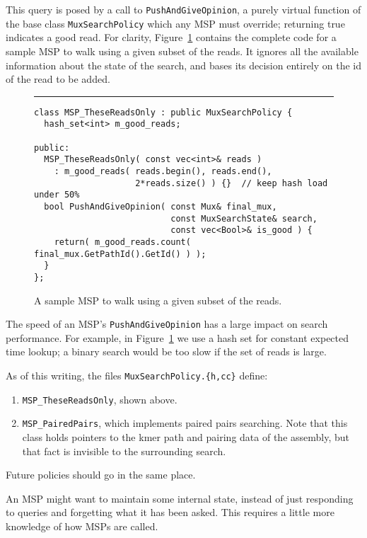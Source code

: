 \documentclass[11pt]{article}
\begin{document}
This query is posed by a call to {\tt PushAndGiveOpinion}, a purely virtual function
of the base class {\tt MuxSearchPolicy} which any MSP must override; returning
true indicates a good read.
For clarity, Figure~\ref{fig_MSP}
contains the complete code for a sample MSP to walk using a given subset of the reads.
It ignores all the available information about the state of the search, and bases
its decision entirely on the id of the read to be added.
\begin{figure}[b]
\vspace{-2ex}
\hrule
\vspace{-1ex}
\caption{A sample MSP to walk using a given subset of the reads.}
\label{fig_MSP}
\small
\vspace*{-1ex}
\begin{verbatim}
class MSP_TheseReadsOnly : public MuxSearchPolicy {
  hash_set<int> m_good_reads;

public:
  MSP_TheseReadsOnly( const vec<int>& reads )
    : m_good_reads( reads.begin(), reads.end(), 
                    2*reads.size() ) {}  // keep hash load under 50%
  bool PushAndGiveOpinion( const Mux& final_mux, 
                           const MuxSearchState& search,
                           const vec<Bool>& is_good ) {
    return( m_good_reads.count( final_mux.GetPathId().GetId() ) );
  }
};
\end{verbatim}
\vspace*{-5ex}
\end{figure}

The speed of an MSP's {\tt PushAndGiveOpinion} has a large impact on
search performance.  For example, in Figure~\ref{fig_MSP} we use a hash set
for constant expected time lookup; a binary search would be too slow if the
set of reads is large.

As of this writing, the files \verb"MuxSearchPolicy.{h,cc}" define:
\begin{enumerate}

\item \verb"MSP_TheseReadsOnly", shown above. 

\item \verb"MSP_PairedPairs", which implements paired pairs searching.
Note that this class holds pointers to the kmer path and pairing data of the assembly,
but that fact is invisible to the surrounding search.

\end{enumerate}
Future policies should go in the same place.

An MSP might want to maintain some internal state, instead of just responding
to queries and forgetting what it has been asked.  This requires a little more
knowledge of how MSPs are called.
\end{document}
